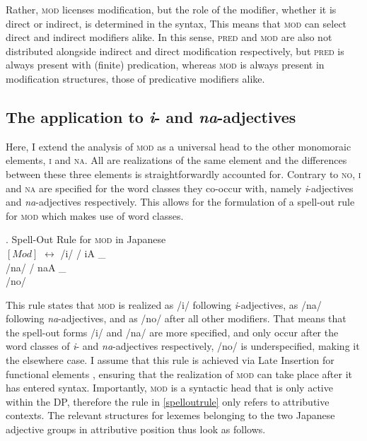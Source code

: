 \documentclass [output=book,colorlinks,citecolor=brown]{langscibook}
\begin{document}
Rather, \textsc{mod} licenses modification, but the role of the modifier, whether it is direct or indirect, is determined in the syntax, This means that \textsc{mod} can select direct and indirect modifiers alike. In this sense, \textsc{pred} and \textsc{mod} are also not distributed alongside indirect and direct modification respectively, but \textsc{pred} is always present with (finite) predication, whereas \textsc{mod} is always present in modification structures, those of predicative modifiers alike.

\subsection{The application to \textit{i}- and \textit{na}-adjectives} \label{appl adj}

Here, I extend the analysis of \textsc{mod} as a universal head to the other monomoraic elements, \textsc{i} and \textsc{na}. All are realizations of the same element and the differences between these three elements is straightforwardly accounted for. Contrary to \textsc{no}, \textsc{i} and \textsc{na} are specified for the word classes they co-occur with, namely \textit{i}-adjectives and \textit{na}-adjectives respectively. This allows for the formulation of a spell-out rule for \textsc{mod} which makes use of word classes. %

\ex. Spell-Out Rule for \textsc{mod} in Japanese\\
$[Mod]$ $\leftrightarrow$ /i/ / iA \_ \\
\phantom{$[Mod]$ $\leftrightarrow$} /na/ / naA \_ \\
\phantom{$[Mod]$ $\leftrightarrow$} /no/ \label{spelloutrule}

This rule states that \textsc{mod} is realized as /i/ following \textit{i}-adjectives, as /na/ following \textit{na}-adjectives, and as /no/ after all other modifiers. That means that the spell-out forms /i/ and /na/ are more specified, and only occur after the word classes of \textit{i}- and \textit{na}-adjectives respectively, /no/ is underspecified, making it the elsewhere case. I assume that this rule is achieved via Late Insertion for functional elements \citep{halle:1993:distributed, chomsky:2001:derivation}, ensuring that the realization of \textsc{mod} can take place after it has entered syntax. Importantly, \textsc{mod} is a syntactic head that is only active within the DP, therefore the rule in \ref{spelloutrule} only refers to attributive contexts. The relevant structures for lexemes belonging to the two Japanese adjective groups in attributive position thus look as follows. %
\end{document}
